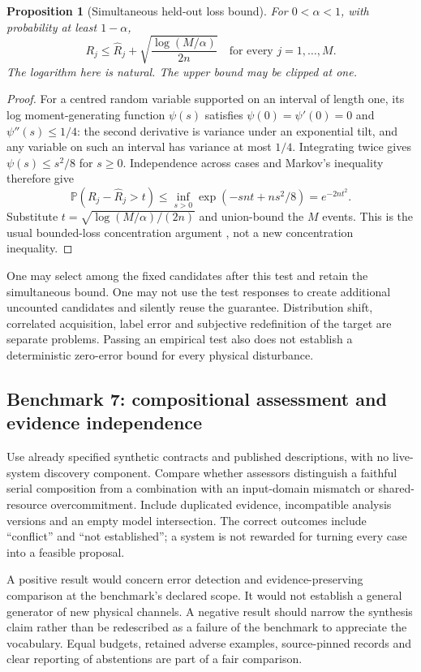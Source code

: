 \documentclass[11pt,a4paper]{article}
\newtheorem{proposition}[theorem]{Proposition}
\theoremstyle{definition}
\theoremstyle{remark}
\newcommand{\Prob}{\mathbb{P}}
\begin{document}
\begin{proposition}[Simultaneous held-out loss bound]\label{prop:heldout}
For $0<\alpha<1$, with probability at least $1-\alpha$,
\begin{equation}\label{eq:heldout}
 R_j\leq\hat R_j+\sqrt{\frac{\log(M/\alpha)}{2n}}
 \quad\text{for every }j=1,\ldots,M.
\end{equation}
The logarithm here is natural. The upper bound may be clipped at one.
\end{proposition}
\begin{proof}
For a centred random variable supported on an interval of length one, its log moment-generating function $\psi(s)$ satisfies $\psi(0)=\psi'(0)=0$ and $\psi''(s)\leq1/4$: the second derivative is variance under an exponential tilt, and any variable on such an interval has variance at most $1/4$. Integrating twice gives $\psi(s)\leq s^2/8$ for $s\geq0$. Independence across cases and Markov's inequality therefore give
\[
 \Prob(R_j-\hat R_j>t)\leq
 \inf_{s>0}\exp(-snt+ns^2/8)=e^{-2nt^2}.
\]
Substitute $t=\sqrt{\log(M/\alpha)/(2n)}$ and union-bound the $M$ events. This is the usual bounded-loss concentration argument \citep{hoeffding}, not a new concentration inequality.
\end{proof}

One may select among the fixed candidates after this test and retain the simultaneous bound. One may not use the test responses to create additional uncounted candidates and silently reuse the guarantee. Distribution shift, correlated acquisition, label error and subjective redefinition of the target are separate problems. Passing an empirical test also does not establish a deterministic zero-error bound for every physical disturbance.

\subsection{Benchmark 7: compositional assessment and evidence independence}
Use already specified synthetic contracts and published descriptions, with no live-system discovery component. Compare whether assessors distinguish a faithful serial composition from a combination with an input-domain mismatch or shared-resource overcommitment. Include duplicated evidence, incompatible analysis versions and an empty model intersection. The correct outcomes include ``conflict'' and ``not established''; a system is not rewarded for turning every case into a feasible proposal.

A positive result would concern error detection and evidence-preserving comparison at the benchmark's declared scope. It would not establish a general generator of new physical channels. A negative result should narrow the synthesis claim rather than be redescribed as a failure of the benchmark to appreciate the vocabulary. Equal budgets, retained adverse examples, source-pinned records and clear reporting of abstentions are part of a fair comparison.
\end{document}
